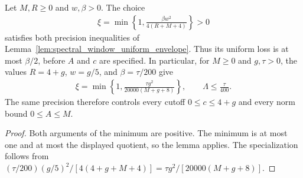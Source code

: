 \begin{corollary}
    \label{cor:spectral_window_precision_choice}
    \leanok
    Let $M,R\ge0$ and $w,\beta>0$. The choice
    \begin{align}
        \xi=\min\left\{1,\frac{\beta w^2}{4(R+M+4)}\right\}>0
    \end{align}
    satisfies both precision inequalities of
    Lemma~\ref{lem:spectral_window_uniform_envelope}. Thus its uniform
    loss is at most $\beta/2$, before $A$ and $c$ are specified.
    In particular, for $M\ge0$ and $g,\tau>0$, the values
    $R=4+g$, $w=g/5$, and $\beta=\tau/200$ give
    \begin{align}
        \xi=\min\left\{1,
        \frac{\tau g^2}{20000(M+g+8)}\right\},
        \qquad\Lambda\le\frac{\tau}{400}.
    \end{align}
    The same precision therefore controls every cutoff $0\le c\le4+g$
    and every norm bound $0\le A\le M$.
\end{corollary}
\begin{proof}\leanok
    Both arguments of the minimum are positive. The minimum is at most
    one and at most the displayed quotient, so the lemma applies.
    The specialization follows from
    $(\tau/200)(g/5)^2/[4(4+g+M+4)]
        =\tau g^2/[20000(M+g+8)]$.
\end{proof}
